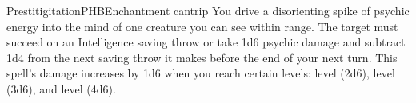 \begin{spell}{Prestitigitation}{PHB}{Enchantment cantrip}
{
}
You drive a disorienting spike of psychic energy into
the mind of one creature you can see within range.
The target must succeed on an Intelligence saving
throw or take 1d6 psychic damage and subtract 1d4
from the next saving throw it makes before the end
of your next turn.
This spell's damage increases by 1d6 when you
reach certain levels:  level (2d6),  level (3d6),
and  level (4d6).
\end{spell}